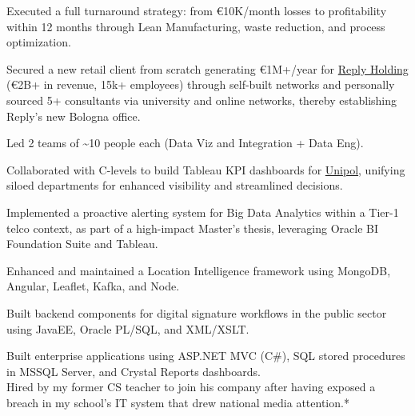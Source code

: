 \documentclass[]{deedy-resume-reversed}
\begin{document}
\begin{minipage}[t]{0.60\textwidth}
\begin{tightemize}
\item Executed a full turnaround strategy: from €10K/month losses to profitability within 12 months through Lean Manufacturing, waste reduction, and process optimization.
\end{tightemize}

\sectionsep
{}
\begin{tightemize}
\item Secured a new retail client from scratch generating €1M+/year for \href{https://www.reply.com}{Reply Holding} (€2B+ in revenue, 15k+ employees) through self-built networks and personally sourced 5+ consultants via university and online networks, thereby establishing Reply's new Bologna office.

\item Led 2 teams of \~{}10 people each (Data Viz and Integration + Data Eng).

\item Collaborated with C-levels to build Tableau KPI dashboards for \href{https://www.unipol.it/}{Unipol}, unifying siloed departments for enhanced visibility and streamlined decisions.
\end{tightemize}

\sectionsep
{}
\begin{tightemize}
\item Implemented a proactive alerting system for Big Data Analytics within a Tier-1 telco context, as part of a high-impact Master's thesis, leveraging Oracle BI Foundation Suite and Tableau.
\item Enhanced and maintained a Location Intelligence framework using MongoDB, Angular, Leaflet, Kafka, and Node. 
\end{tightemize}

\sectionsep
{}
Built backend components for digital signature workflows in the public sector using JavaEE, Oracle PL/SQL, and XML/XSLT.

\sectionsep
{}
Built enterprise applications using ASP.NET MVC (C\#), SQL stored procedures in MSSQL Server, and Crystal Reports dashboards.\\
\vspace{1pt}
Hired by my former CS teacher to join his company after having exposed a breach in my school's IT system that drew national media attention.*

%
%
\end{minipage}
\end{document}
